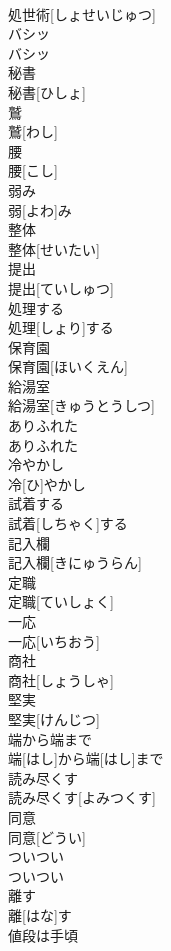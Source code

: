 \documentclass[8pt]{extreport}
\begin{document}
\begin{CJK}{UTF8}{min}
\\	処世術[しょせいじゅつ]	
\\	バシッ	
\\	バシッ	
\\	秘書	
\\	秘書[ひしょ]	
\\	鷲	
\\	鷲[わし]	
\\	腰	
\\	腰[こし]	
\\	弱み	
\\	弱[よわ]み	
\\	整体	
\\	整体[せいたい]	
\\	提出	
\\	提出[ていしゅつ]	
\\	処理する	
\\	処理[しょり]する	
\\	保育園	
\\	保育園[ほいくえん]	
\\	給湯室	
\\	給湯室[きゅうとうしつ]	
\\	ありふれた	
\\	ありふれた	
\\	冷やかし	
\\	冷[ひ]やかし	
\\	試着する	
\\	試着[しちゃく]する	
\\	記入欄	
\\	記入欄[きにゅうらん]	
\\	定職	
\\	定職[ていしょく]	
\\	一応	
\\	一応[いちおう]	
\\	商社	
\\	商社[しょうしゃ]	
\\	堅実	
\\	堅実[けんじつ]	
\\	端から端まで	
\\	端[はし]から端[はし]まで	
\\	読み尽くす	
\\	読み尽くす[よみつくす]	
\\	同意	
\\	同意[どうい]	
\\	ついつい	
\\	ついつい	
\\	離す	
\\	離[はな]す	
\\	値段は手頃	

\end{CJK}
\end{document}
